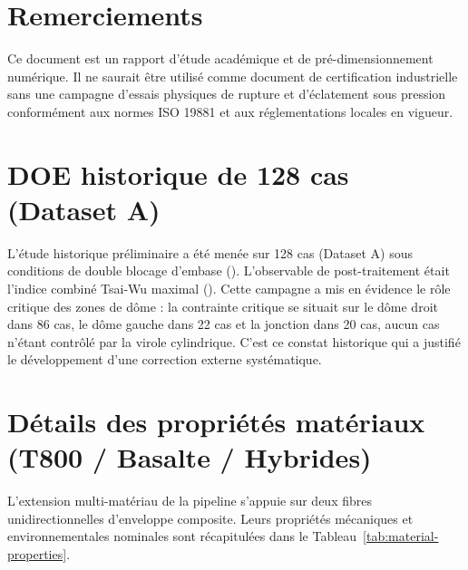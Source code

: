 \documentclass[10pt,twocolumn]{article}
\newcommand{\code}[1]{\texttt{\detokenize{#1}}}
\begin{document}
\section*{Remerciements}
Ce document est un rapport d'étude académique et de pré-dimensionnement numérique. Il ne saurait être utilisé comme document de certification industrielle sans une campagne d'essais physiques de rupture et d'éclatement sous pression conformément aux normes ISO 19881 et aux réglementations locales en vigueur.




\onecolumn
\appendix

\section{DOE historique de 128 cas (Dataset A)}

L'étude historique préliminaire a été menée sur 128 cas (Dataset A) sous conditions de double blocage d'embase (\code{both_boss_rings}). L'observable de post-traitement était l'indice combiné Tsai-Wu maximal (\code{max_combined}). Cette campagne a mis en évidence le rôle critique des zones de dôme : la contrainte critique se situait sur le dôme droit dans 86 cas, le dôme gauche dans 22 cas et la jonction dans 20 cas, aucun cas n'étant contrôlé par la virole cylindrique. C'est ce constat historique qui a justifié le développement d'une correction externe systématique.

\section{Détails des propriétés matériaux (T800 / Basalte / Hybrides)}

L'extension multi-matériau de la pipeline s'appuie sur deux fibres unidirectionnelles d'enveloppe composite. Leurs propriétés mécaniques et environnementales nominales sont récapitulées dans le Tableau~\ref{tab:material-properties}.
\end{document}
